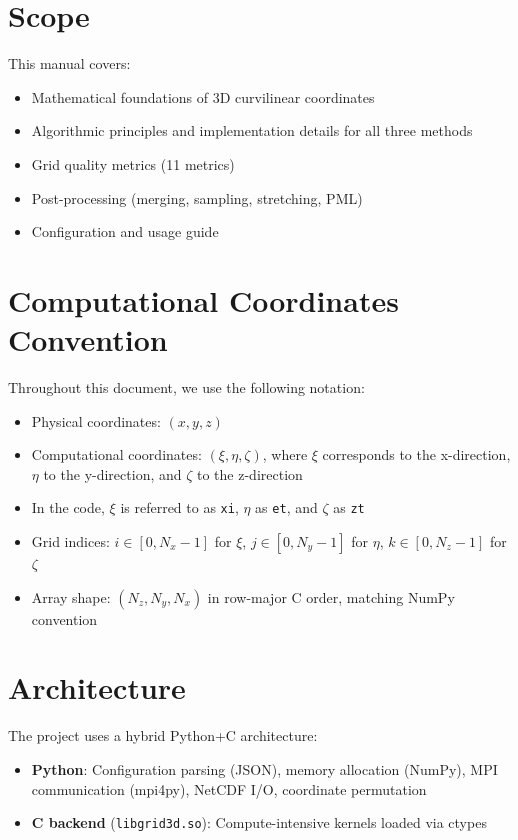 \documentclass[11pt,a4paper]{report}
\begin{document}
\section{Scope}

This manual covers:
\begin{itemize}
    \item Mathematical foundations of 3D curvilinear coordinates
    \item Algorithmic principles and implementation details for all three methods
    \item Grid quality metrics (11 metrics)
    \item Post-processing (merging, sampling, stretching, PML)
    \item Configuration and usage guide
\end{itemize}

\section{Computational Coordinates Convention}

Throughout this document, we use the following notation:
\begin{itemize}
    \item Physical coordinates: $(x, y, z)$
    \item Computational coordinates: $(\xi, \eta, \zeta)$, where $\xi$ corresponds to the x-direction, $\eta$ to the y-direction, and $\zeta$ to the z-direction
    \item In the code, $\xi$ is referred to as \texttt{xi}, $\eta$ as \texttt{et}, and $\zeta$ as \texttt{zt}
    \item Grid indices: $i \in [0, N_x-1]$ for $\xi$, $j \in [0, N_y-1]$ for $\eta$, $k \in [0, N_z-1]$ for $\zeta$
    \item Array shape: $(N_z, N_y, N_x)$ in row-major C order, matching NumPy convention
\end{itemize}

\section{Architecture}

The project uses a hybrid Python+C architecture:
\begin{itemize}
    \item \textbf{Python}: Configuration parsing (JSON), memory allocation (NumPy), MPI communication (mpi4py), NetCDF I/O, coordinate permutation
    \item \textbf{C backend} (\texttt{libgrid3d.so}): Compute-intensive kernels loaded via ctypes
\end{itemize}
\end{document}

